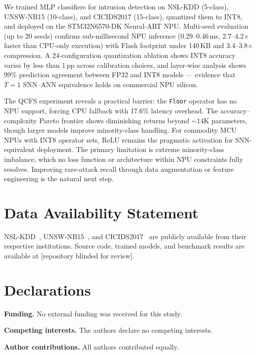 \documentclass[10pt,twocolumn]{article}
\begin{document}
We trained MLP classifiers for intrusion detection on NSL-KDD
(5-class), UNSW-NB15 (10-class), and CICIDS2017 (15-class), quantized
them to INT8, and deployed on the STM32N6570-DK Neural-ART NPU.
Multi-seed evaluation (up to 20 seeds) confirms sub-millisecond NPU inference
(0.29--0.46\,ms, 2.7--4.2$\times$ faster than CPU-only execution)
with Flash footprint under 140\,KB and 3.4--3.8$\times$ compression.
A 24-configuration quantization ablation shows INT8 accuracy varies
by less than 1\,pp across calibration choices, and layer-wise analysis
shows 99\% prediction agreement between FP32 and INT8 models ---
evidence that $T{=}1$ SNN--ANN equivalence holds on commercial NPU
silicon.

The QCFS experiment reveals a practical barrier: the \texttt{Floor}
operator has no NPU support, forcing CPU fallback with 17.6\% latency
overhead.
The accuracy--complexity Pareto frontier shows diminishing returns
beyond ${\sim}$14K parameters, though larger models improve
minority-class handling.
For commodity MCU NPUs with INT8 operator sets, ReLU remains the
pragmatic activation for SNN-equivalent deployment.
The primary limitation is extreme minority-class imbalance, which no
loss function or architecture within NPU constraints fully resolves.
Improving rare-attack recall through data augmentation or feature
engineering is the natural next step.

\balance
\section*{Data Availability Statement}

NSL-KDD~\cite{tavallaee2009nslkdd}, UNSW-NB15~\cite{moustafa2015unsw},
and CICIDS2017~\cite{sharafaldin2018cicids} are publicly available
from their respective institutions.
Source code, trained models, and benchmark results are available at
[repository blinded for review].

\section*{Declarations}

\textbf{Funding.} No external funding was received for this study.

\textbf{Competing interests.} The authors declare no competing interests.

\textbf{Author contributions.} All authors contributed equally.

{\small


}
\end{document}
